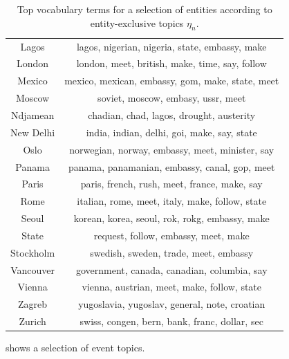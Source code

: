 \begin{table}
\begin{tabular}{cc}
Lagos & lagos, nigerian, nigeria, state, embassy, make \\
London & london, meet, british, make, time, say, follow \\
Mexico & mexico, mexican, embassy, gom, make, state, meet \\
Moscow & soviet, moscow, embasy, ussr, meet \\
Ndjamean & chadian, chad, lagos, drought, austerity \\
New Delhi & india, indian, delhi, goi, make, say, state \\
Oslo & norwegian, norway, embassy, meet, minister, say \\
Panama & panama, panamanian, embassy, canal, gop, meet \\ 
Paris & paris, french, rush, meet, france, make, say \\
Rome & italian, rome, meet, italy, make, follow, state \\
Seoul & korean, korea, seoul, rok, rokg, embassy, make \\
State & request, follow, embassy, meet, make \\
Stockholm & swedish, sweden, trade, meet, embassy \\
Vancouver & government, canada, canadian, columbia, say \\
Vienna & vienna, austrian, meet, make, follow, state \\ 
Zagreb & yugoslavia, yugoslav, general, note, croatian \\ 
Zurich & swiss, congen, bern, bank, franc, dollar, sec \\
\bottomrule
\end{tabular}
\label{tab:enttopics}
\caption{Top vocabulary terms for a selection of entities according to entity-exclusive topics $\eta_n$.}
\end{table}

 shows a selection of event topics.

